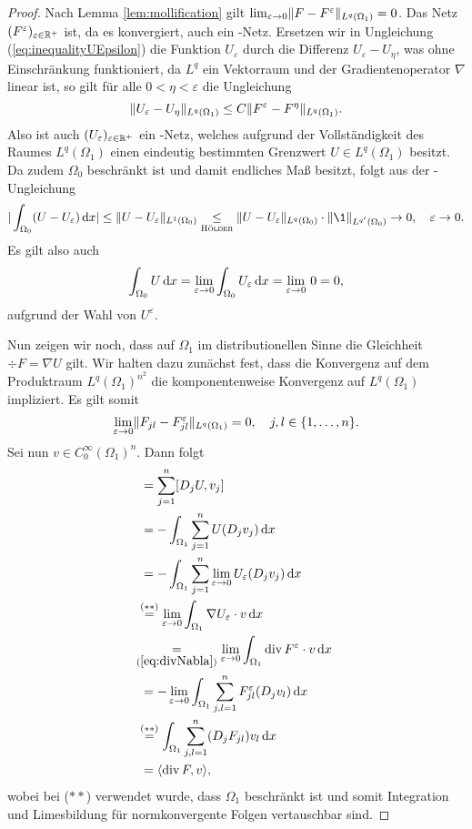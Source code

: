 \begin{proof}
  Nach Lemma \ref{lem:mollification} gilt $\lim_{\varepsilon \to 0} \lVert F - F^\varepsilon \rVert_{L^q(\Omega_1)} = 0$.
  Das Netz $(F^\varepsilon)_{\varepsilon \in \mathbb{R}^+}$ ist, da es konvergiert, auch ein \cauchy-Netz.
  Ersetzen wir in Ungleichung (\ref{eq:inequalityUEpsilon}) die Funktion $U_\varepsilon$ durch die Differenz $U_\varepsilon - U_\eta$, was ohne Einschränkung funktioniert, da $L^q$ ein Vektorraum und der Gradientenoperator $\nabla$ linear ist, so gilt für alle $0 < \eta < \varepsilon$ die Ungleichung
  $$
    \lVert U_\varepsilon - U_\eta \rVert_{L^q(\Omega_1)}
    \leq C \lVert F^\varepsilon - F^\eta \rVert_{L^q(\Omega_1)}.
  $$
  Also ist auch $(U_\varepsilon)_{\varepsilon \in \mathbb{R}^+}$ ein \cauchy-Netz, welches aufgrund der Vollständigkeit des Raumes $L^q(\Omega_1)$ einen eindeutig bestimmten Grenzwert $U \in L^q(\Omega_1)$ besitzt.
  Da zudem $\Omega_0$ beschränkt ist und damit endliches Maß besitzt, folgt aus der \hoelder\hyp{}Ungleichung
  $$
    | \int_{\Omega_0} (U - U_\varepsilon) \d x |
    \leq  \norm{U - U_\varepsilon}_{L^1(\Omega_0)} 
    \underset{\hoelder}{\leq} \norm{U - U_\varepsilon}_{L^q(\Omega_0)}\cdot \norm{\1}_{L^{q'}(\Omega_0)}
    \to 0, \quad \varepsilon \to 0.
  $$
  Es gilt also auch
  $$
  \int_{\Omega_0} U \, {\operatorname{d}\!{x}} 
  = \lim_{\varepsilon \to 0} \int_{\Omega_0} U_\varepsilon \, {\operatorname{d}\!{x}} 
  = \lim_{\varepsilon \to 0}\, 0 =  0,
  $$
  aufgrund der Wahl von $U^\varepsilon$.

  Nun zeigen wir noch, dass auf $\Omega_1$ im distributionellen Sinne die Gleichheit $\div F = \nabla U$ gilt. 
  Wir halten dazu zunächst fest, dass die Konvergenz auf dem Produktraum $L^q(\Omega_1)^{n^2}$ die komponentenweise Konvergenz auf $L^q(\Omega_1)$ impliziert.
  Es gilt somit 
  $$
  \lim_{\varepsilon \to 0} \lVert F_{jl} - F_{jl}^\varepsilon \rVert_{L^q(\Omega_1)} = 0, \quad j,l \in \{ 1,\dots,n\}. 
  $$ 
  Sei nun $v \in C_0^\infty(\Omega_1)^n$.
  Dann folgt
  \begin{align*}
    [\nabla U, v]
    &= \sum_{j = 1}^n [D_jU, v_j]\\
    &= -\int_{\Omega_1} \sum_{j = 1}^n U (D_j v_j) \d x \\ 
    &= -\int_{\Omega_1} \sum_{j = 1}^n \lim_{\varepsilon \to 0} U_\varepsilon (D_j v_j) \d x \\
    &\hspace{-0.10cm}\overset{(\ast\ast)}{=} \lim_{\varepsilon \to 0} \int_{\Omega_1} \nabla U_\varepsilon \cdot v \d x \\
    &\hspace{-0.21cm}\underset{(\ref{eq:divNabla})}{=} \lim_{\varepsilon \to 0} \int_{\Omega_1} \div F^\varepsilon \cdot v \d x \\
    &= -\lim_{\varepsilon \to 0} \int_{\Omega_1} \sum_{j,l=1}^n F_{jl}^\varepsilon (D_j v_l) \d x \\
    &\hspace{-0.10cm}\overset{(\ast\ast)}{=} \int_{\Omega_1} \sum_{j,l=1}^n (D_j F_{jl}) v_l \d x \\
    &= \langle \div F, v \rangle,
  \end{align*}
  wobei bei ($\ast\ast$) verwendet wurde, dass $\Omega_1$ beschränkt ist und somit Integration und Limesbildung für normkonvergente Folgen vertauschbar sind.


\end{proof}
